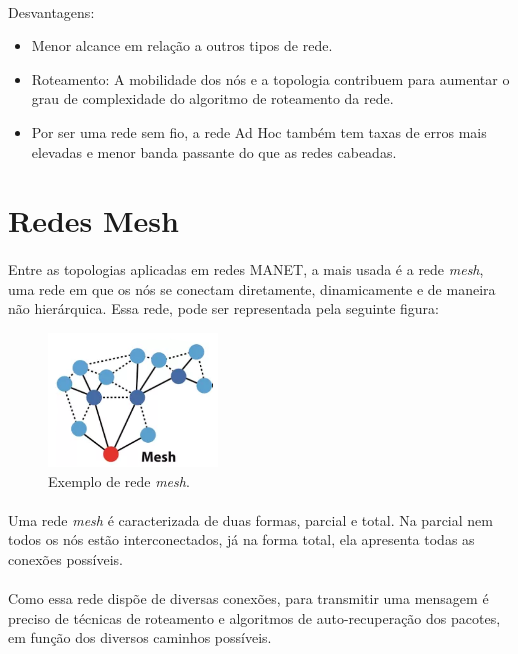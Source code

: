 \paragraph{} Desvantagens:
 
\begin{itemize}
   \item Menor alcance em relação a outros tipos de rede.
   \item Roteamento: A mobilidade dos nós e a topologia contribuem para aumentar o grau de complexidade do algoritmo de roteamento da rede.
   \item Por ser uma rede sem fio, a rede Ad Hoc também tem taxas de erros mais elevadas e menor banda passante do que as redes cabeadas.
\end{itemize}

\section{Redes Mesh}
\paragraph{} Entre as topologias aplicadas em redes MANET, a mais usada é a rede \textit{mesh}, uma rede em que os nós se conectam diretamente, dinamicamente e de maneira não hierárquica. Essa rede, pode ser representada pela seguinte figura:

\begin{figure}[!ht]
	\centering
	\includegraphics[width=0.4\textwidth]{Figuras/mesh.PNG}   
	\caption{Exemplo de rede \textit{mesh}. \citep{Mesh}}
	\label{fig:figura2}
\end{figure}

\paragraph{} Uma rede \textit{mesh} é caracterizada de duas formas, parcial e total. Na parcial nem todos os nós estão interconectados, já na forma total, ela apresenta todas as conexões possíveis. 

\paragraph{} Como essa rede dispõe de diversas conexões, para transmitir uma mensagem é preciso de técnicas de roteamento e algoritmos de auto-recuperação dos pacotes, em função dos diversos caminhos possíveis.